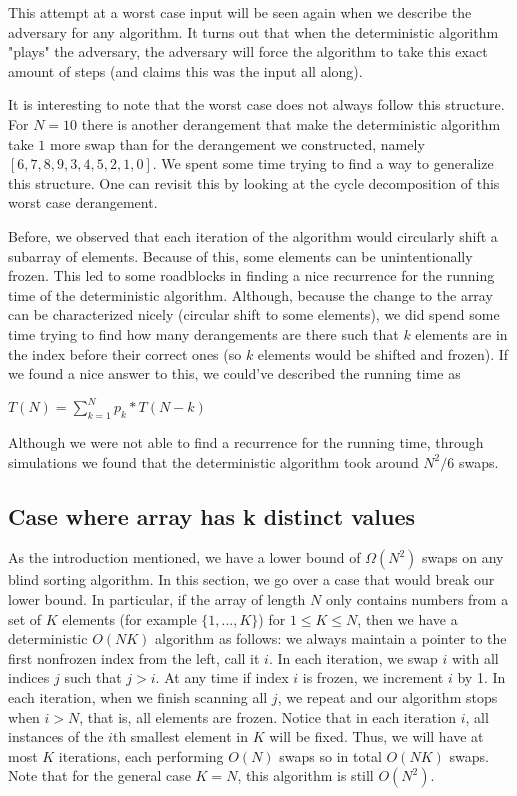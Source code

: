 \documentclass{article}
\begin{document}
This attempt at a worst case input will be seen again when we describe the adversary for any algorithm.
It turns out that when the deterministic algorithm "plays" the adversary, the adversary will force
the algorithm to take this exact amount of steps (and claims this was the input all along).

It is interesting to note that the worst case does not always follow this structure. For $N = 10$
there is another derangement that make the deterministic algorithm take $1$ more swap than for
the derangement we constructed, namely $[6, 7, 8, 9, 3, 4, 5, 2, 1, 0]$.
We spent some time trying to find a way to generalize this structure. One can revisit this by looking
at the cycle decomposition of this worst case derangement.

Before, we observed that each iteration of the algorithm would circularly shift a subarray of elements.
Because of this, some elements can be unintentionally frozen. This led to some roadblocks
in finding a nice recurrence for the running time of the deterministic algorithm. Although, because the
change to the array can be characterized nicely (circular shift to some elements), we did spend some time
trying to find how many derangements are there such that 
$k$ elements are in the index before their correct ones (so $k$ elements would be shifted and frozen).
If we found a nice answer to this, we could've
described the running time as 

$ T(N) = \sum_{k = 1}^{N}{p_k * T(N - k)}$

Although we were not able to find a recurrence for the running time, through simulations we found that
the deterministic algorithm took around $N^2/6$ swaps.

\subsection{Case where array has k distinct values}
As the introduction mentioned, we have a lower bound of $\Omega(N^2)$ swaps on any blind sorting algorithm.
In this section,
we go over a case that would break our lower bound. In particular, if the array of length $N$ only
contains numbers from a set of $K$ elements (for example $\{1, ..., K\}$) for $ 1 \leq K \leq N $, then we have a 
deterministic $O(NK)$ algorithm as follows: we always maintain a pointer to the first nonfrozen index
from the left, call it $i$. In each iteration, we swap $i$ with all indices $j$ such that $j > i$. 
At any time if index $i$ is frozen, we increment $i$ by 1. In each iteration, when we finish scanning all $j$, we
repeat and our algorithm stops when $i > N$, that is, all elements are frozen.
Notice that in each iteration $i$, all instances of the $i$th smallest element in $K$ will be fixed.
Thus, we will have at most $K$ iterations, each performing $O(N)$ swaps so in total $O(NK)$ swaps.
Note that for the general case $K = N$, this algorithm is still $O(N^2)$.
\end{document}
